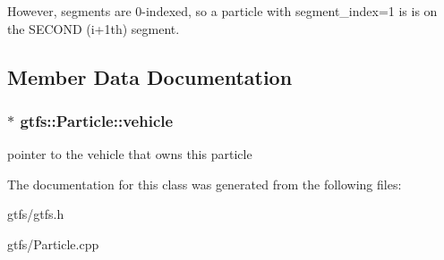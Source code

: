 However, segments are 0-\/indexed, so a particle with segment\+\_\+index=1 is is on the S\+E\+C\+O\+ND (i+1th) segment.

\subsection{Member Data Documentation}
\subsubsection[{\texorpdfstring{vehicle}{vehicle}}]{$\ast$ gtfs\+::\+Particle\+::vehicle}\hypertarget{classgtfs_1_1Particle_a81c313d505ecb592d79463f167dfb76c}{}\label{classgtfs_1_1Particle_a81c313d505ecb592d79463f167dfb76c}
pointer to the vehicle that owns this particle 

The documentation for this class was generated from the following files\+:\begin{DoxyCompactItemize}
\item 
gtfs/gtfs.\+h\item 
gtfs/Particle.\+cpp\end{DoxyCompactItemize}
